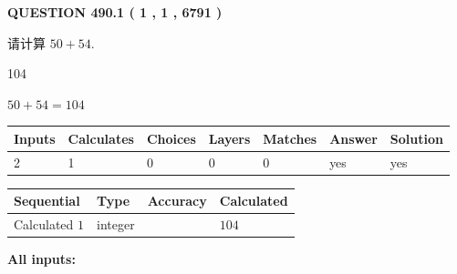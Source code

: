 \documentclass{ctexart}
\begin{document}
\vspace{0.2in}
  
{\textbf{\Large{QUESTION
490.1 
 ( 1 , 1 , 6791 )
}}}
  
  
 
请计算 $ %
50 +  %
54 $.
 
 
 
\noindent{}
 
 

104
 
 
\noindent{}
 
 

 
 
 
\noindent{}
 
 

$ %
50 +  %
54=   %
104$
 
 
\noindent{}
 
 

 
   
   
   
   
\noindent\begin{tabular}{|l|l|l|l|l|l|l|}
 \hline
Inputs & Calculates & Choices & Layers & Matches & Answer & Solution \\ \hline
 2  & 
 1  & 
 0
  & 
 0  & 
 0  & 
  yes & 
  yes 
  \\ \hline
 \end{tabular}
   
   
   
   
\noindent{}
   
   
  
  
\noindent\begin{tabular}{|l|l|l|l|}
\hline
 Sequential & Type & Accuracy & Calculated \\ 
\hline
 
 
  Calculated $  1 $ & integer &  & 
  $ 104 $ 
 \\  \hline  
 \end{tabular}
   
   
   
   
\noindent\vspace{0.1in}\hspace{-0.08in} {\textbf{\Large{All inputs: }}}
   
\end{document}
